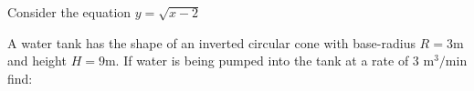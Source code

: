 \documentclass[11pt,fleqn]{exam}
\renewcommand{\d}[1]{\ensuremath{\operatorname{d}\!{#1}}}
\begin{document}
\begin{questions}

\addpoints
\newpage
\question[15] Consider the equation $y=\sqrt{x-2}$



\newpage
\addpoints
\question[15] A water tank has the shape of an inverted circular cone with base-radius $R=3$m and height $H=9$m. If water is being pumped into the tank at a rate of 3 m${}^3/$min find:
\begin{parts}

\end{parts}
\end{questions}
\end{document}
